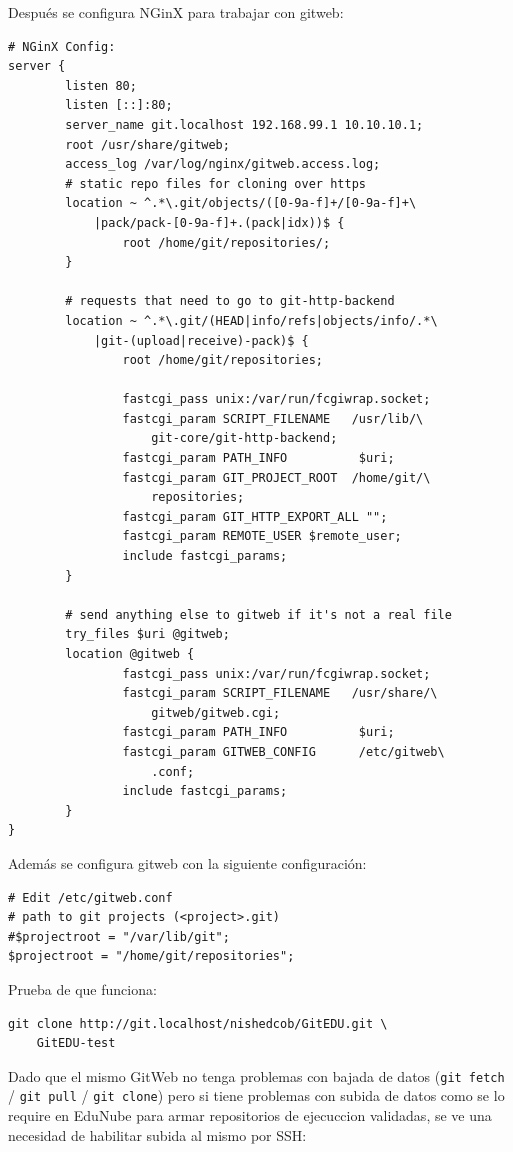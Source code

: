 Después se configura NGinX para trabajar con gitweb:
\begin{lstlisting}
# NGinX Config:
server {
        listen 80;
        listen [::]:80;
        server_name git.localhost 192.168.99.1 10.10.10.1;
        root /usr/share/gitweb;
        access_log /var/log/nginx/gitweb.access.log;
        # static repo files for cloning over https
        location ~ ^.*\.git/objects/([0-9a-f]+/[0-9a-f]+\
        	|pack/pack-[0-9a-f]+.(pack|idx))$ {
                root /home/git/repositories/;
        }

        # requests that need to go to git-http-backend
        location ~ ^.*\.git/(HEAD|info/refs|objects/info/.*\
        	|git-(upload|receive)-pack)$ {
                root /home/git/repositories;

                fastcgi_pass unix:/var/run/fcgiwrap.socket;
                fastcgi_param SCRIPT_FILENAME   /usr/lib/\
                	git-core/git-http-backend;
                fastcgi_param PATH_INFO          $uri;
                fastcgi_param GIT_PROJECT_ROOT  /home/git/\
                	repositories;
                fastcgi_param GIT_HTTP_EXPORT_ALL "";
                fastcgi_param REMOTE_USER $remote_user;
                include fastcgi_params;
        }

        # send anything else to gitweb if it's not a real file
        try_files $uri @gitweb;
        location @gitweb {
                fastcgi_pass unix:/var/run/fcgiwrap.socket;
                fastcgi_param SCRIPT_FILENAME   /usr/share/\
                	gitweb/gitweb.cgi;
                fastcgi_param PATH_INFO          $uri;
                fastcgi_param GITWEB_CONFIG      /etc/gitweb\
                	.conf;
                include fastcgi_params;
        }
}
\end{lstlisting}

Además se configura gitweb con la siguiente configuración:
\begin{lstlisting}
# Edit /etc/gitweb.conf
# path to git projects (<project>.git)
#$projectroot = "/var/lib/git";
$projectroot = "/home/git/repositories";
\end{lstlisting}

Prueba de que funciona:
\begin{lstlisting}
git clone http://git.localhost/nishedcob/GitEDU.git \
	GitEDU-test
\end{lstlisting}

Dado que el mismo GitWeb no tenga problemas con bajada de datos (\texttt{git fetch} / \texttt{git pull} / \texttt{git clone}) pero si tiene problemas con subida de datos como se lo require en EduNube para armar repositorios de ejecuccion validadas, se ve una necesidad de habilitar subida al mismo por SSH:

